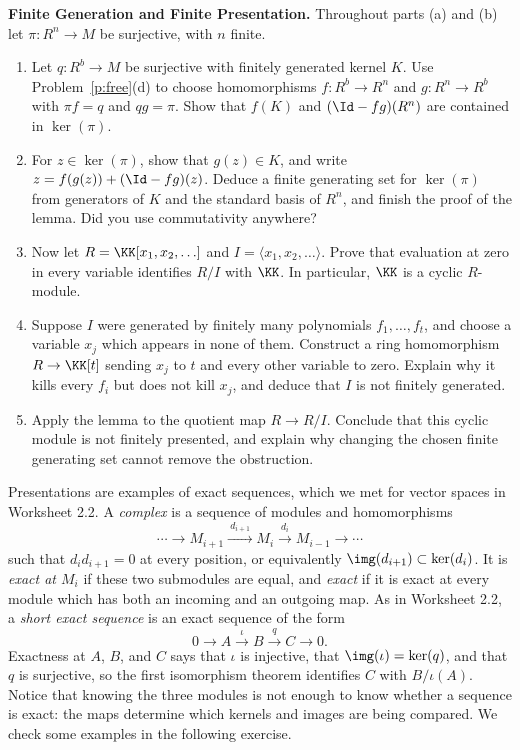 \documentclass[12pt,reqno]{amsart}
\begin{document}
\begin{problems}
\item\label{p:finitepresentation} \textbf{Finite Generation and Finite Presentation.} Throughout parts (a) and (b) let $\pi:R^n\to M$ be surjective, with $n$ finite.
\begin{enumerate}
\item Let $q:R^b\to M$ be surjective with finitely generated kernel $K$. Use Problem~\ref{p:free}(d) to choose homomorphisms $f:R^b\to R^n$ and $g:R^n\to R^b$ with $\pi f=q$ and $qg=\pi$. Show that $f(K)$ and $(\Id-fg)(R^n)$ are contained in $\ker(\pi)$.
\item For $z\in\ker(\pi)$, show that $g(z)\in K$, and write $z=f(g(z))+(\Id-fg)(z)$. Deduce a finite generating set for $\ker(\pi)$ from generators of $K$ and the standard basis of $R^n$, and finish the proof of the lemma. Did you use commutativity anywhere?
\item Now let $R=\KK[x_1,x_2,\ldots]$ and $I=\langle x_1,x_2,\ldots\rangle$. Prove that evaluation at zero in every variable identifies $R/I$ with $\KK$. In particular, $\KK$ is a cyclic $R$-module.
\item Suppose $I$ were generated by finitely many polynomials $f_1,\ldots,f_t$, and choose a variable $x_j$ which appears in none of them. Construct a ring homomorphism $R\to\KK[t]$ sending $x_j$ to $t$ and every other variable to zero. Explain why it kills every $f_i$ but does not kill $x_j$, and deduce that $I$ is not finitely generated.
\item Apply the lemma to the quotient map $R\to R/I$. Conclude that this cyclic module is not finitely presented, and explain why changing the chosen finite generating set cannot remove the obstruction.
\end{enumerate}
\end{problems}

\hrulefill

Presentations are examples of exact sequences, which we met for vector spaces in Worksheet 2.2. A \emph{complex} is a sequence of modules and homomorphisms
\[
\cdots\longrightarrow M_{i+1}\xrightarrow{\ d_{i+1}\ }M_i\xrightarrow{\ d_i\ }M_{i-1}\longrightarrow\cdots
\]
such that $d_id_{i+1}=0$ at every position, or equivalently $\img(d_{i+1})\subset\ker(d_i)$. It is \emph{exact at $M_i$} if these two submodules are equal, and \emph{exact} if it is exact at every module which has both an incoming and an outgoing map. As in Worksheet 2.2, a \emph{short exact sequence} is an exact sequence of the form
\[
0\longrightarrow A\xrightarrow{\ \iota\ }B\xrightarrow{\ q\ }C\longrightarrow0.
\]
Exactness at $A$, $B$, and $C$ says that $\iota$ is injective, that $\img(\iota)=\ker(q)$, and that $q$ is surjective, so the first isomorphism theorem identifies $C$ with $B/\iota(A)$. Notice that knowing the three modules is not enough to know whether a sequence is exact: the maps determine which kernels and images are being compared. We check some examples in the following exercise.
\end{document}
